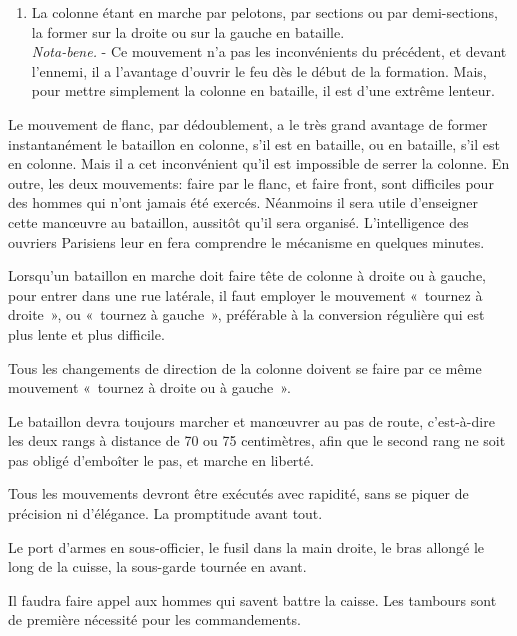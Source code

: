 \documentclass[french,twoside]{book} %
\begin{document}
\begin{enumerate}[itemsep=0pt,]
{Nota-bene.} - Cette formation en bataille étant la plus prompte, est la meilleure. Mais elle présente des difficultés. On ne peut former régulièrement la colonne à droite ou à gauche en bataille, que si les pelotons, ou les sections ou les demi-sections ont exactement conservé leurs distances, c’est-à-dire si la distance qui les sépare est égale à leur front. Si elle est plus grande, il reste des vides dans le bataillon formé en bataille. Si, au contraire, la distance est moindre que le front, les fractions du bataillon, en arrivant à l’alignement, se heurtent et s’entassent les unes sur les autres, faute de place ;
\item La colonne étant en marche par pelotons, par sections ou par demi-sections, la former sur la droite ou sur la gauche en bataille. \\
\emph{Nota-bene.} - Ce mouvement n’a pas les inconvénients du précédent, et devant l’ennemi, il a l’avantage d’ouvrir le feu dès le début de la formation. Mais, pour mettre simplement la colonne en bataille, il est d’une extrême lenteur.
\end{enumerate}

\noindent Le mouvement de flanc, par dédoublement, a le très grand avantage de former instantanément le bataillon en colonne, s’il est en bataille, ou en bataille, s’il est en colonne. Mais il a cet inconvénient qu’il est impossible de serrer la colonne. En outre, les deux mouvements: faire par le flanc, et faire front, sont difficiles pour des hommes qui n’ont jamais été exercés. Néanmoins il sera utile d’enseigner cette manœuvre au bataillon, aussitôt qu’il sera organisé. L'intelligence des ouvriers Parisiens leur en fera comprendre le mécanisme en quelques minutes.\par
Lorsqu’un bataillon en marche doit faire tête de colonne à droite ou à gauche, pour entrer dans une rue latérale, il faut employer le mouvement « tournez à droite », ou « tournez à gauche », préférable à la conversion régulière qui est plus lente et plus difficile.\par
Tous les changements de direction de la colonne doivent se faire par ce même mouvement « tournez à droite ou à gauche ».\par
Le bataillon devra toujours marcher et manœuvrer au pas de route, c’est-à-dire les deux rangs à distance de 70 ou 75 centimètres, afin que le second rang ne soit pas obligé d’emboîter le pas, et marche en liberté.\par
Tous les mouvements devront être exécutés avec rapidité, sans se piquer de précision ni d’élégance. La promptitude avant tout.\par
Le port d’armes en sous-officier, le fusil dans la main droite, le bras allongé le long de la cuisse, la sous-garde tournée en avant.\par
Il faudra faire appel aux hommes qui savent battre la caisse. Les tambours sont de première nécessité pour les commandements.
\end{document}
